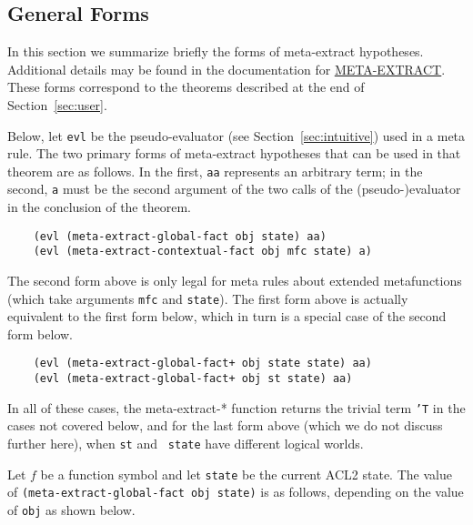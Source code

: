 \subsection{General Forms}
\label{sec:general}

In this section we summarize briefly the forms of meta-extract
hypotheses.  Additional details may be found in the documentation for
\href{http://www.cs.utexas.edu/users/moore/acl2/manuals/current/manual/index.html?topic=ACL2\_\_\_\_META-EXTRACT}{\underline{META-EXTRACT}}.
These forms correspond to the theorems described at the end of
Section~\ref{sec:user}.

Below, let {\tt evl} be the pseudo-evaluator (see
Section~\ref{sec:intuitive}) used in a meta rule.  The two primary
forms of meta-extract hypotheses that can be used in that theorem are
as follows.  In the first, {\tt aa} represents an arbitrary term; in
the second, {\tt a} must be the second argument of the two calls of
the (pseudo-)evaluator in the conclusion of the theorem.

\begin{verbatim}
    (evl (meta-extract-global-fact obj state) aa)
    (evl (meta-extract-contextual-fact obj mfc state) a)
\end{verbatim}

The second form above is only legal for meta rules about extended
metafunctions (which take arguments {\tt mfc} and {\tt state}).  The
first form above is actually equivalent to the first form below, which
in turn is a special case of the second form below.

\begin{verbatim}
    (evl (meta-extract-global-fact+ obj state state) aa)
    (evl (meta-extract-global-fact+ obj st state) aa)
\end{verbatim}

In all of these cases, the meta-extract-* function returns the trivial
term {\tt 'T} in the cases not covered below, and for the last form
above (which we do not discuss further here), when {\tt st} and {\tt
  state} have different logical worlds.

Let $f$ be a function symbol and let {\tt state} be the current ACL2
state.  The value of {\tt (meta-\allowbreak{}extract-\allowbreak{}global-\allowbreak{}fact obj state)} is as
follows, depending on the value of {\tt obj} as shown below.

